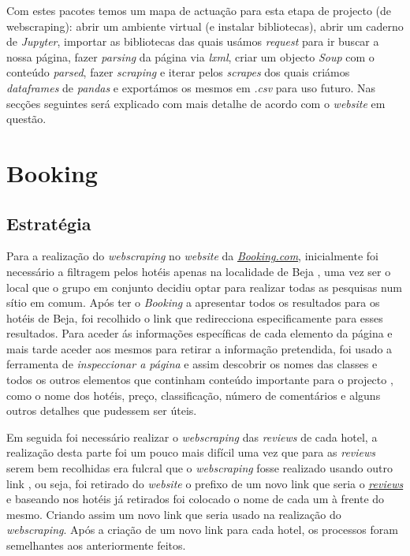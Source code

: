 Com estes pacotes temos um mapa de actuação para esta etapa de projecto (de webscraping): abrir um ambiente virtual (e instalar bibliotecas), abrir um caderno de \textit{Jupyter}, importar as bibliotecas das quais usámos \textit{request} para ir buscar a nossa página, fazer \textit{parsing} da página via \textit{lxml}, criar um objecto \textit{Soup} com o conteúdo \textit{parsed}, fazer \textit{scraping} e iterar pelos \textit{scrapes} dos quais criámos \textit{dataframes} de \textit{pandas} e exportámos os mesmos em \textit{.csv} para uso futuro. Nas secções seguintes será explicado com mais detalhe de acordo com o \textit{website} em questão.

\section{Booking}   
\subsection{Estratégia}
Para a realização do \textit{webscraping} no \textit{website} da \href{www.Booking.com}{\textit{Booking.com}}, inicialmente foi necessário a filtragem pelos hotéis apenas na localidade de Beja \cite{yt1}, uma vez ser o local que o grupo em conjunto decidiu optar para realizar todas as pesquisas num sítio em comum.
Após ter o \textit{Booking} a apresentar todos os resultados para os hotéis de Beja, foi recolhido o link que redirecciona especificamente para esses resultados.
Para aceder ás informações específicas de cada elemento da página e mais tarde aceder aos mesmos para retirar a informação pretendida, foi usado a ferramenta de \textit{inspeccionar a página} e assim descobrir os nomes das classes e todos os outros elementos que continham conteúdo importante para o projecto \cite{yt1}, como o nome dos hotéis, preço, classificação, número de comentários e alguns outros detalhes que pudessem ser úteis.

Em seguida foi necessário realizar o \textit{webscraping} das \textit{reviews} de cada hotel, a realização desta parte foi um pouco mais difícil uma vez que para as \textit{reviews} serem bem recolhidas era fulcral que o \textit{webscraping} fosse realizado usando outro link \cite{yt1}, ou seja, foi retirado do \textit{website} o prefixo de um novo link que seria o \href{https://www.booking.com/reviews/pt/hotel/}{\textit{reviews}} e baseando nos hotéis já retirados foi colocado o nome de cada um à frente do mesmo. Criando assim um novo link que seria usado na realização do \textit{webscraping}. Após a criação de um novo link para cada hotel, os processos foram semelhantes aos anteriormente feitos.

